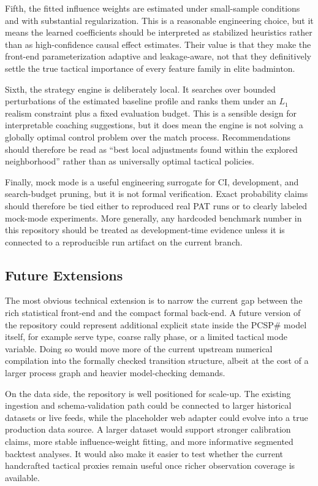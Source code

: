 \documentclass{article}
\begin{document}
Fifth, the fitted influence weights are estimated under small-sample conditions and with substantial regularization. This is a reasonable engineering choice, but it means the learned coefficients should be interpreted as stabilized heuristics rather than as high-confidence causal effect estimates. Their value is that they make the front-end parameterization adaptive and leakage-aware, not that they definitively settle the true tactical importance of every feature family in elite badminton.

Sixth, the strategy engine is deliberately local. It searches over bounded perturbations of the estimated baseline profile and ranks them under an \(L_1\) realism constraint plus a fixed evaluation budget. This is a sensible design for interpretable coaching suggestions, but it does mean the engine is not solving a globally optimal control problem over the match process. Recommendations should therefore be read as ``best local adjustments found within the explored neighborhood'' rather than as universally optimal tactical policies.

Finally, mock mode is a useful engineering surrogate for CI, development, and search-budget pruning, but it is not formal verification. Exact probability claims should therefore be tied either to reproduced real PAT runs or to clearly labeled mock-mode experiments. More generally, any hardcoded benchmark number in this repository should be treated as development-time evidence unless it is connected to a reproducible run artifact on the current branch.

\subsection*{Future Extensions}
The most obvious technical extension is to narrow the current gap between the rich statistical front-end and the compact formal back-end. A future version of the repository could represent additional explicit state inside the PCSP\# model itself, for example serve type, coarse rally phase, or a limited tactical mode variable. Doing so would move more of the current upstream numerical compilation into the formally checked transition structure, albeit at the cost of a larger process graph and heavier model-checking demands.

On the data side, the repository is well positioned for scale-up. The existing ingestion and schema-validation path could be connected to larger historical datasets or live feeds, while the placeholder web adapter could evolve into a true production data source. A larger dataset would support stronger calibration claims, more stable influence-weight fitting, and more informative segmented backtest analyses. It would also make it easier to test whether the current handcrafted tactical proxies remain useful once richer observation coverage is available.
\end{document}
